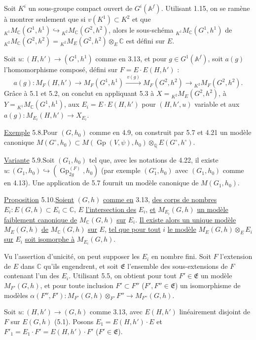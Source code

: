 \documentclass[10pt]{article}
\newcommand{\Af}{\mathbb A^f}
\newcommand{\C}{\mathbb C}
\newcommand{\Q}{\mathbb Q}
\newcommand{\Gp}{\operatorname{Gp}}
\newcommand{\MC}{M_{\C}}
\begin{document}
Soit $K^i$ un sous-groupe compact ouvert de $G^i(\Af)$. Utilisant 1.15, on se ramène à montrer seulement que si $v(K^1)\subset K^2$ et que ${}_{K^1}\MC(G^1,h^1)\hookrightarrow{}_{K^2}\MC(G^2,h^2)$, alors le sous-schéma ${}_{K^1}\MC(G^1,h^1)$ de ${}_{K^2}\MC(G^2,h^2)={}_{K^2}M_E(G^2,h^2)\otimes_E\C$ est défini sur $E$.

Soit $u:(H,h')\to(G^1,h^1)$ comme en 3.13, et pour $g\in G^1(\Af)$, soit $a(g)$ l'homomorphisme composé, défini sur $F=E\cdot E(H,h')$ :
\[
a(g):M_F(H,h')\longrightarrow M_F(G^1,h^1)
 \xrightarrow{\ v(g)\ } M_F(G^2,h^2)
 \longrightarrow{}_{K^2}M_F(G^2,h^2).
\]
Grâce à 5.1 et 5.2, on conclut en appliquant 5.3 à $X={}_{K^2}M_E(G^2,h^2)$, à $Y={}_{K^1}\MC(G^1,h^1)$, aux $E_i=E\cdot E(H,h')$ pour $(H,h',u)$ variable et aux $a(g):M_{E_i}(H,h')\longrightarrow X_{E_i}$.

\noindent \uline{Exemple} 5.8.\quad Pour $(G,h_0)$ comme en 4.9, on construit par 5.7 et 4.21 un modèle canonique $M(G^\circ,h_0)\subset M(\Gp(V,\psi),h_0)\otimes_{\Q}E(G^\circ,h^\circ)$.

\noindent \uline{Variante} 5.9.\quad Soit $(G_1,h_0)$ tel que, avec les notations de 4.22, il existe $u:(G_1,h_0)\hookrightarrow(\Gp_{2g}^{(F)},h_0)$ (par exemple $(G_1^\circ,h_0)$ avec $(G_1,h_0)$ comme en 4.13). Une application de 5.7 fournit un modèle canonique de $M(G_1,h_0)$.

\noindent \uline{Proposition} 5.10.\quad \uline{Soient} $(G,h)$ \uline{comme en} 3.13, \uline{des corps de nombres} $E_i:E(G,h)\subset E_i\subset\C$, $E$ \uline{l'intersection des} $E_i$, \uline{et} $M_{E_i}(G,h)$ \uline{un modèle faiblement canonique de} $\MC(G,h)$ \uline{sur} $E_i$. \uline{Il existe alors un unique modèle} $M_E(G,h)$ \uline{de} $\MC(G,h)$ \uline{sur} $E$, \uline{tel que pour tout} $i$ \uline{le modèle} $M_E(G,h)\otimes_EE_i$ \uline{sur} $E_i$ \uline{soit isomorphe à} $M_{E_i}(G,h)$.

Vu l'assertion d'unicité, on peut supposer les $E_i$ en nombre fini. Soit $F$ l'extension de $E$ dans $\C$ qu'ils engendrent, et soit $\mathfrak E$ l'ensemble des sous-extensions de $F$ contenant l'un des $E_i$. Utilisant 5.5, on obtient pour tout $F'\in\mathfrak E$ un modèle $M_{F'}(G,h)$, et pour toute inclusion $F'\subset F''$ ($F',F''\in\mathfrak E$) un isomorphisme de modèles $\alpha(F'',F'):M_{F'}(G,h)\otimes_{F'}F''\longrightarrow M_{F''}(G,h)$.

Soit $u:(H,h')\to(G,h)$ comme 3.13, avec $E(H,h')$ linéairement disjoint de $F$ sur $E(G,h)$ (5.1). Posons $E_1=E(H,h')\cdot E$ et $F'_1=E_1\cdot F'=E(H,h')\cdot F'$ ($F'\in\mathfrak E$).
\end{document}
